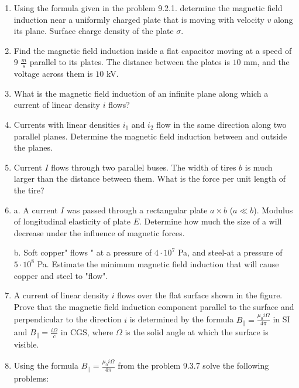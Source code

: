 \documentclass{article}
\begin{document}
\begin{enumerate}[label=9.3.\arabic*]


\item Using the formula given in the problem 9.2.1. determine the magnetic field induction near a uniformly charged plate that is moving with velocity $v$ along its plane. Surface charge density of the plate $\sigma$.

\item Find the magnetic field induction inside a flat capacitor moving at a speed of $9$ $\frac{m}{s}$ parallel to its plates. The distance between the plates is $10$ mm, and the voltage across them is $10$ kV.

\item What is the magnetic field induction of an infinite plane along which a current of linear density $i$ flows?

\item Currents with linear densities $i_1$ and $i_2$ flow in the same direction along two parallel planes. Determine the magnetic field induction between and outside the planes.

\item Current $I$ flows through two parallel buses. The width of tires $b$ is much larger than the distance between them. What is the force per unit length of the tire?

\item a. A current $I$ was passed through a rectangular plate $a \times b$ ($a \ll b$). Modulus of longitudinal elasticity of plate $E$. Determine how much the size of a will decrease under the influence of magnetic forces. 

b. Soft copper" flows " at a pressure of $4 \cdot 10^7$ Pa, and steel-at a pressure of $5 \cdot 10^8$ Pa. Estimate the minimum magnetic field induction that will cause copper and steel to "flow".

\item A current of linear density $i$ flows over the flat surface shown in the figure. Prove that the magnetic field induction component parallel to the surface and perpendicular to the direction $i$ is determined by the formula $B_\parallel = \frac{\mu_0 i \Omega}{4 \pi}$ in SI and $B_\parallel = \frac{i \Omega}{c}$ in CGS, where $\Omega$ is the solid angle at which the surface is visible.

\item Using the formula $B_\parallel = \frac{\mu_0 i \Omega} {4 \pi}$ from the problem 9.3.7 solve the following problems: 


\end{enumerate}
\end{document}
